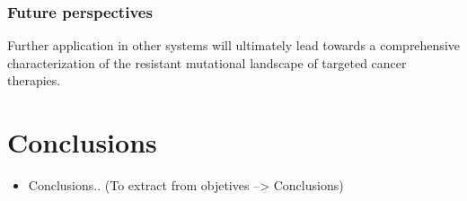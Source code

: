 \documentclass[11pt, b5paper,twoside]{tesi_upf}
\begin{document}
\subsubsection{Future perspectives}

 \par Further application in other systems will ultimately lead towards a comprehensive characterization of the resistant mutational landscape of targeted cancer therapies. 
 
 \clearpage
\section{Conclusions}
 
 
 \begin{itemize}
 
 \item Conclusions.. (To extract from objetives --> Conclusions)
 
 \end{itemize}
 
 
 
 


%



\backmatter
\printindex

\printbibliography
\end{document}
